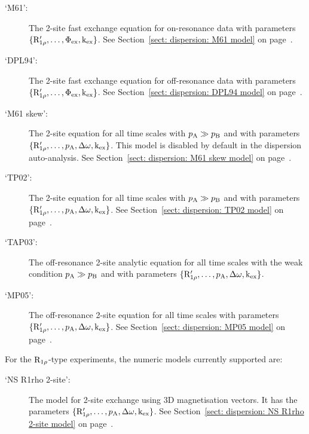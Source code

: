 \begin{description}
\item[`M61':]  The \citet{Meiboom61} 2-site fast exchange equation for on-resonance data with parameters $\{\mathrm{R}_{1\rho}', \dots, \Phi_\textrm{ex}, \textrm{k}_\textrm{ex}\}$.  See Section~\ref{sect: dispersion: M61 model} on page~\pageref{sect: dispersion: M61 model}.
\item[`DPL94':]  The \citet{Davis94} 2-site fast exchange equation for off-resonance data with parameters $\{\mathrm{R}_{1\rho}', \dots, \Phi_\textrm{ex}, \textrm{k}_\textrm{ex}\}$.  See Section~\ref{sect: dispersion: DPL94 model} on page~\pageref{sect: dispersion: DPL94 model}.
\item[`M61 skew':]  The \citet{Meiboom61} 2-site equation for all time scales with $p_\textrm{A} \gg p_\textrm{B}$ and with parameters $\{\mathrm{R}_{1\rho}', \dots, p_\textrm{A}, \Delta\omega, \textrm{k}_\textrm{ex}\}$.  This model is disabled by default in the dispersion auto-analysis.  See Section~\ref{sect: dispersion: M61 skew model} on page~\pageref{sect: dispersion: M61 skew model}.
\item[`TP02':]  The \citet{TrottPalmer02} 2-site equation for all time scales with $p_\textrm{A} \gg p_\textrm{B}$ and with parameters $\{\mathrm{R}_{1\rho}', \dots, p_\textrm{A}, \Delta\omega, \textrm{k}_\textrm{ex}\}$.  See Section~\ref{sect: dispersion: TP02 model} on page~\pageref{sect: dispersion: TP02 model}.
\item[`TAP03':]  The \citet{Trott03} off-resonance 2-site analytic equation for all time scales with the weak condition $p_\textrm{A} \gg p_\textrm{B}$ and with parameters $\{\mathrm{R}_{1\rho}', \dots, p_\textrm{A}, \Delta\omega, \textrm{k}_\textrm{ex}\}$.
\item[`MP05':]  The \citet{MiloushevPalmer05} off-resonance 2-site equation for all time scales with parameters $\{\mathrm{R}_{1\rho}', \dots, p_\textrm{A}, \Delta\omega, \textrm{k}_\textrm{ex}\}$.  See Section~\ref{sect: dispersion: MP05 model} on page~\pageref{sect: dispersion: MP05 model}.
\end{description}


For the $\mathrm{R}_{1\rho}$-type experiments, the numeric models currently supported are:

\begin{description}
\item[`NS R1rho 2-site':]  The model for 2-site exchange using 3D magnetisation vectors.  It has the parameters $\{\mathrm{R}_{1\rho}', \dots, p_\textrm{A}, \Delta\omega, \textrm{k}_\textrm{ex}\}$.  See Section~\ref{sect: dispersion: NS R1rho 2-site model} on page~\pageref{sect: dispersion: NS R1rho 2-site model}.
\end{description}



